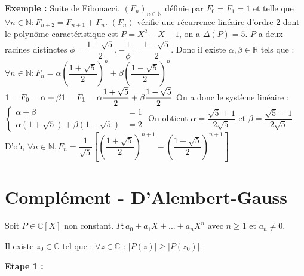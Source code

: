 \documentclass[12pt,a4paper]{report}
\begin{document}
\par \textbf{Exemple :} Suite de Fibonacci.
\newline $(F_n)_{n \in \mathbb{N}}$ définie par $F_0 = F_1 = 1$ et telle que $\forall n \in \mathbb{N} : F_{n+2} = F_{n+1}+F_n$.
\newline $(F_n)$ vérifie une récurrence linéaire d'ordre 2 dont le polynôme caractéristique est $P = X^2 - X - 1$, on a $\Delta(P)=5$.
\newline $P$ a deux racines distinctes $\phi = \dfrac{1+\sqrt{5}}{2}, -\dfrac{1}{\phi} = \dfrac{1-\sqrt{5}}{2}$.
\newline Donc il existe $\alpha,\beta \in \mathbb{R}$ tels que : $\forall n \in \mathbb{N} : F_n = \alpha \left(\dfrac{1+\sqrt{5}}{2}\right)^n + \beta \left(\dfrac{1-\sqrt{5}}{2}\right)^n$
\newline \newline $1=F_0 = \alpha + \beta
\newline 1= F_1 = \alpha \dfrac{1+\sqrt{5}}{2} + \beta \dfrac{1-\sqrt{5}}{2}$
\newline On a donc le système linéaire : 
\newline $\begin{cases}
\alpha + \beta &=1 \\
\alpha(1+\sqrt{5}) + \beta(1-\sqrt{5}) &= 2
\end{cases}$
\newline On obtient $\alpha = \dfrac{\sqrt{5}+1}{2\sqrt{5}}$ et $\beta = \dfrac{\sqrt{5}-1}{2\sqrt{5}}$
\newline \newline D'où, $\forall n \in \mathbb{N}, F_n = \dfrac{1}{\sqrt{5}} \left[\left(\dfrac{1+\sqrt{5}}{2}\right)^{n+1} - \left(\dfrac{1-\sqrt{5}}{2}\right)^{n+1} \right]$

\newpage

\section{Complément - D'Alembert-Gauss}
Soit $P \in \mathbb{C}\left[X\right]$ non constant. $P : a_0+a_1X+...+a_nX^n$ avec $n \geq 1$ et $a_n \neq 0$.
\newline \par {}
\begin{theoreme}{}{}
Il existe $z_0 \in \mathbb{C}$ tel que : $\forall z \in \mathbb{C}$ : $\lvert P(z) \rvert \geq \lvert P(z_0) \rvert$.
\end{theoreme}

\noindent \textbf{Etape 1 :}
\end{document}
